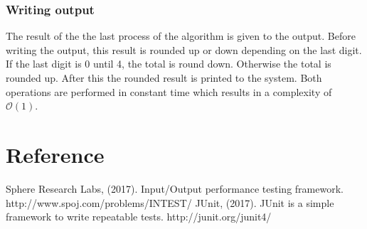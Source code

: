 \documentclass{article}
\newcommand{\bigO}[1]{\mathcal{O}(#1)}
\begin{document}
\subsubsection{Writing output}
The result of the the last process of the algorithm is given to the output. Before writing the output, this result is rounded up or down depending on the last digit. If the last digit is 0 until 4, the total is round down. Otherwise the total is rounded up. After this the rounded result is printed to the system. Both operations are performed in constant time which results in a complexity of $\bigO{1}$.

\newpage
\section{Reference}
Sphere Research Labs, (2017). Input/Output performance testing framework. \newline
http://www.spoj.com/problems/INTEST/
\newline
\newline
JUnit, (2017). JUnit is a simple framework to write repeatable tests. \newline
http://junit.org/junit4/
\end{document}
